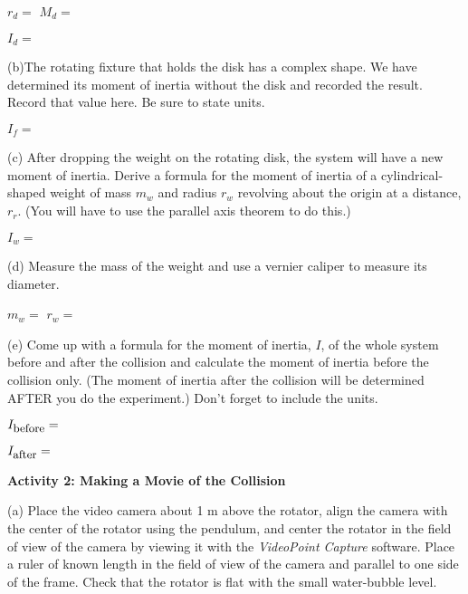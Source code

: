 \( r_{d} =\)  \hfill{}\( M_{d}= \) \hfill{}
\vspace{5mm}

\( I_{d}= \)
\vspace{5mm}

(b)The rotating fixture that holds the disk has a complex shape. We have determined
its moment of inertia without the disk and recorded the result. Record that
value here. Be sure to state units.
\vspace{5mm}

\( I_{f} =\)
\vspace{5mm}

(c) After dropping the weight on the rotating disk, the system will have a new
moment of inertia. Derive a formula for the moment of inertia of a cylindrical-shaped
weight of mass \( m_{w} \) and radius \( r_{w} \) revolving about the origin
at a distance, \( r_{r} \). (You will have to use the parallel axis theorem to do this.)
\vspace{5mm}

\( I_{w} =\)  
\vspace{5mm}

(d) Measure the mass of the weight and use a vernier caliper to measure its diameter.
\vspace{5mm}

\( m_{w} =\)  \hfill{}\(r_{w} =\) \hfill{}
\vspace{5mm}

(e) Come up with a formula for the moment of inertia, $I$, of the whole system
before and after the collision and calculate the moment of inertia before the
collision only. (The moment of inertia after the collision will be determined AFTER you do the experiment.) Don't forget to include the units.
\vspace{5mm}

\( I_{\mbox{\small before}}= \) 
\vspace{5mm}

\( I_{\mbox{\small after}} =\)  
\vspace{5mm}

\textbf{Activity 2: Making a Movie of the Collision} 

(a) Place the video camera about 1 m above the rotator, align the camera with
the center of the rotator using the pendulum, and center the rotator in the
field of view of the camera by viewing it with the \textit{VideoPoint
Capture} software.
Place a ruler of known length in the field of view of the camera and parallel
to one side of the frame. Check that the rotator is flat with the small water-bubble
level.

